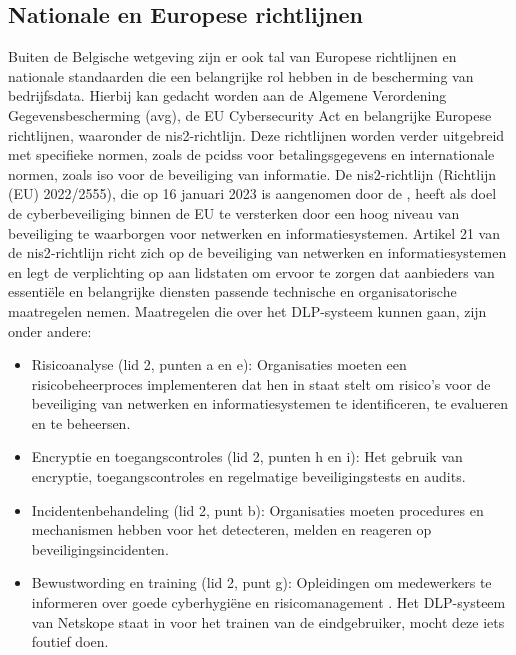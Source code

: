 \subsection{Nationale en Europese richtlijnen}%

Buiten de Belgische wetgeving zijn er ook tal van Europese richtlijnen en nationale standaarden die een belangrijke rol hebben in de bescherming van bedrijfsdata. 
Hierbij kan gedacht worden aan de Algemene Verordening Gegevensbescherming (\gls{avg}), de EU Cybersecurity Act en belangrijke Europese richtlijnen, waaronder de \gls{nis2}-richtlijn. 
Deze richtlijnen worden verder uitgebreid met specifieke normen, zoals de \gls{pcidss} voor betalingsgegevens en internationale normen, zoals \gls{iso} voor de beveiliging van informatie. 
De \gls{nis2}-richtlijn (Richtlijn (EU) 2022/2555), die op 16 januari 2023 is aangenomen door de \textcite{nis2directive}, 
heeft als doel de cyberbeveiliging binnen de EU te versterken door een hoog niveau van beveiliging te waarborgen voor netwerken en informatiesystemen. 
Artikel 21 van de \gls{nis2}-richtlijn richt zich op de beveiliging van netwerken en informatiesystemen en legt de verplichting op aan lidstaten om 
ervoor te zorgen dat aanbieders van essentiële en belangrijke diensten passende technische en organisatorische maatregelen nemen. 
Maatregelen die over het DLP-systeem kunnen gaan, zijn onder andere: 

\begin{itemize}
    \item Risicoanalyse (lid 2, punten a en e): Organisaties moeten een risicobeheerproces implementeren dat hen in staat stelt om risico's voor de beveiliging van netwerken en informatiesystemen te identificeren, te evalueren en te beheersen.
    \item Encryptie en toegangscontroles (lid 2, punten h en i): Het gebruik van encryptie, toegangscontroles en regelmatige beveiligingstests en audits.
    \item Incidentenbehandeling (lid 2, punt b): Organisaties moeten procedures en mechanismen hebben voor het detecteren, melden en reageren op beveiligingsincidenten.
    \item Bewustwording en training (lid 2, punt g): Opleidingen om medewerkers te informeren over goede cyberhygiëne en risicomanagement \autocite{nis2directive}. Het DLP-systeem van Netskope staat in voor het trainen van de eindgebruiker, mocht deze iets foutief doen.
\end{itemize}


